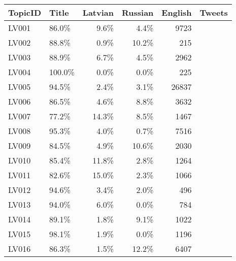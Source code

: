 \begin{tabular}{llrrrr}
\toprule
TopicID  & Title &  Latvian & Russian & English &  Tweets \\
\midrule
LV001    &  86.0\% &  9.6\% &  4.4\% &   9723 \\
LV002    &  88.8\% &  0.9\% & 10.2\% &    215 \\
LV003    &  88.9\% &  6.7\% &  4.5\% &   2962 \\
LV004    & 100.0\% &  0.0\% &  0.0\% &    225 \\
LV005    &  94.5\% &  2.4\% &  3.1\% &  26837 \\
LV006    &  86.5\% &  4.6\% &  8.8\% &   3632 \\
LV007    &  77.2\% & 14.3\% &  8.5\% &   1467 \\
LV008    &  95.3\% &  4.0\% &  0.7\% &   7516 \\
LV009    &  84.5\% &  4.9\% & 10.6\% &   2030 \\
LV010    &  85.4\% & 11.8\% &  2.8\% &   1264 \\
LV011    &  82.6\% & 15.0\% &  2.3\% &   1066 \\
LV012    &  94.6\% &  3.4\% &  2.0\% &    496 \\
LV013    &  94.0\% &  6.0\% &  0.0\% &    784 \\
LV014    &  89.1\% &  1.8\% &  9.1\% &   1022 \\
LV015    &  98.1\% &  1.9\% &  0.0\% &   1196 \\
LV016    &  86.3\% &  1.5\% & 12.2\% &   6407 \\
\bottomrule
\end{tabular}
